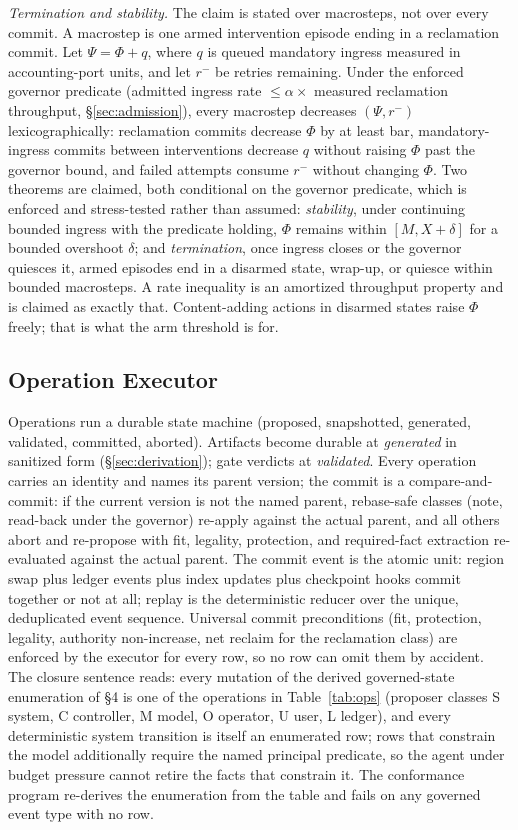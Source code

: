 \documentclass[11pt]{article}
\begin{document}
\emph{Termination and stability.} The claim is stated over macrosteps, not over every commit. A macrostep is one armed intervention episode ending in a reclamation commit. Let $\Psi = \Phi + q$, where $q$ is queued mandatory ingress measured in accounting-port units, and let $r^-$ be retries remaining. Under the enforced governor predicate (admitted ingress rate $\le \alpha \times$ measured reclamation throughput, \S\ref{sec:admission}), every macrostep decreases $(\Psi, r^-)$ lexicographically: reclamation commits decrease $\Phi$ by at least bar, mandatory-ingress commits between interventions decrease $q$ without raising $\Phi$ past the governor bound, and failed attempts consume $r^-$ without changing $\Phi$. Two theorems are claimed, both conditional on the governor predicate, which is enforced and stress-tested rather than assumed: \emph{stability}, under continuing bounded ingress with the predicate holding, $\Phi$ remains within $[M, X + \delta]$ for a bounded overshoot $\delta$; and \emph{termination}, once ingress closes or the governor quiesces it, armed episodes end in a disarmed state, wrap-up, or quiesce within bounded macrosteps. A rate inequality is an amortized throughput property and is claimed as exactly that. Content-adding actions in disarmed states raise $\Phi$ freely; that is what the arm threshold is for.

\subsection{Operation Executor}
\label{sec:executor}
Operations run a durable state machine (proposed, snapshotted, generated, validated, committed, aborted). Artifacts become durable at \emph{generated} in sanitized form (\S\ref{sec:derivation}); gate verdicts at \emph{validated}. Every operation carries an identity and names its parent version; the commit is a compare-and-commit: if the current version is not the named parent, rebase-safe classes (note, read-back under the governor) re-apply against the actual parent, and all others abort and re-propose with fit, legality, protection, and required-fact extraction re-evaluated against the actual parent. The commit event is the atomic unit: region swap plus ledger events plus index updates plus checkpoint hooks commit together or not at all; replay is the deterministic reducer over the unique, deduplicated event sequence. Universal commit preconditions (fit, protection, legality, authority non-increase, net reclaim for the reclamation class) are enforced by the executor for every row, so no row can omit them by accident. The closure sentence reads: every mutation of the derived governed-state enumeration of \S4 is one of the operations in Table~\ref{tab:ops} (proposer classes S system, C controller, M model, O operator, U user, L ledger), and every deterministic system transition is itself an enumerated row; rows that constrain the model additionally require the named principal predicate, so the agent under budget pressure cannot retire the facts that constrain it. The conformance program re-derives the enumeration from the table and fails on any governed event type with no row.
\end{document}

